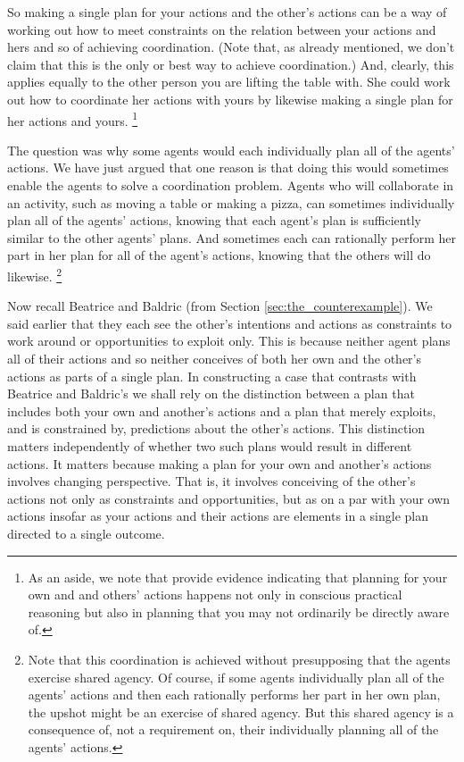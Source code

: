 \documentclass[12pt,\papersize]{extarticle}
\begin{document}
So  making a single plan for your actions and the other's actions can be a way of 
	working out how to 
	meet constraints on the relation between your actions and hers and so of achieving coordination.  
(Note that, as already mentioned,  we don't claim that this  is the only or best way to achieve coordination.)	
And, clearly, this applies equally to the 
 other person you are lifting the table with.
 She  could work out how to coordinate her actions with yours by likewise making a single plan for her actions and yours.%
\footnote{
As an aside, we note that 
\citet{tsai:2011_groop_effect} provide evidence indicating that planning for your own and and others' actions happens not only in conscious practical reasoning but also in planning that you may not ordinarily be directly aware of.
}

The question was why some agents would each individually plan all of the agents' actions.
We have just argued that  
one reason is that
doing this would sometimes enable the agents to solve a coordination problem.
Agents who will collaborate in an activity, such as moving a table or making a pizza, 
can sometimes individually plan all of the agents' actions,
knowing that each agent's plan is sufficiently similar to the other agents' plans.
And sometimes each can rationally perform her part in her plan for all of the agent's actions, knowing that the others will do likewise.%
\footnote{
Note that this coordination is achieved without presupposing that the agents exercise shared agency.
Of course,
	if some agents individually plan all of the agents' actions
	and then each rationally performs her part in her own plan,
	the upshot might be an exercise of shared agency.
But this shared agency is a consequence of, not a requirement on, their individually planning all of the agents' actions.
}


Now recall Beatrice and Baldric (from Section \vref{sec:the_counterexample}).
We said earlier that  they each see the other's intentions and actions  as constraints to work around or opportunities to exploit only.
This is because neither agent plans all of their actions and so neither conceives of both her own and the other's actions as parts of a single plan.
In constructing a case that contrasts with Beatrice and Baldric's we shall rely on the distinction between
a plan that includes both your own and another's actions
and 
a plan that merely exploits, and is constrained by, predictions about the other's actions.
This distinction matters independently of whether two such plans would result in different actions.
It matters because 
making a plan for your own and another's actions 
	involves changing perspective.
That is, it involves conceiving of the other's actions not only as constraints and opportunities, but as on a par with your own actions insofar as your actions and their actions are elements in a single plan directed to a single outcome.
\end{document}
